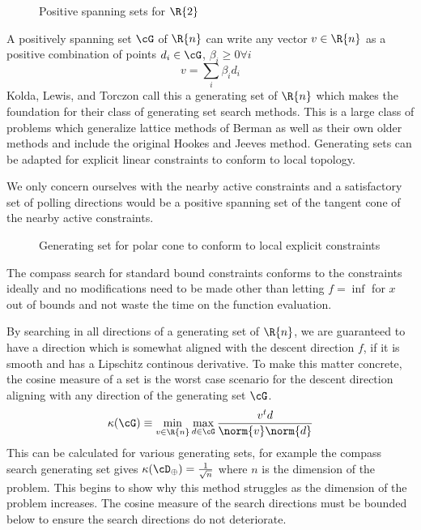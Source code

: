 \begin{figure}
\centering

\caption{Positive spanning sets for $\R{2}$}
\end{figure}

A positively spanning set $\cG$ of $\R{n}$ can write any vector $v \in \R{n}$ as a positive combination of points $d_i \in \cG$,  $\beta_i \geq 0 \forall i$
\begin{equation}
v = \sum_i \beta_i d_i
\end{equation}
Kolda, Lewis, and Torczon \cite{kolda_2003} call this a generating set of $\R{n}$ which makes the foundation for their class of generating set search methods.  This is a large class of problems which generalize lattice methods of Berman \cite{berman_1966} \cite{berman_1969} as well as their own older methods \cite{torczon_1997} \cite{lewis_2000} and include the original Hookes and Jeeves method\cite{hooke_1961}.  Generating sets can be adapted for explicit linear constraints to conform to local topology.

We only concern ourselves with the nearby active constraints and a satisfactory set of polling directions would be a positive spanning set of the tangent cone of the nearby active constraints. 
\begin{figure}
\centering

\caption{Generating set for polar cone to conform to local explicit constraints}
\end{figure}
The compass search for standard bound constraints conforms to the constraints ideally and no modifications need to be made other than letting $f = \inf $ for $x$ out of bounds and not waste the time on the function evaluation.


By searching in all directions of a generating set of $\R{n}$, we are guaranteed to have a direction which is somewhat aligned with the descent direction $f$, if it is smooth and has a Lipschitz continous derivative.  To make this matter concrete, the cosine measure of a set is the worst case scenario for the descent direction aligning with any direction of the generating set $\cG$.
\begin{equation}\label{kappa}
\kappa ( \cG) \equiv \min_{v \in \R{n}} \max_{d \in \cG} \frac{v^t d}{\norm{v} \norm{d}}
\end{equation}
This can be calculated for various generating sets, for example the compass search generating set gives $\kappa(\scd) = \frac{1}{\sqrt{n}}$ where $n$ is the dimension of the problem.  This begins to show why this method struggles as the dimension of the problem increases.  The cosine measure of the search directions must be bounded below to ensure the search directions do not deteriorate.

